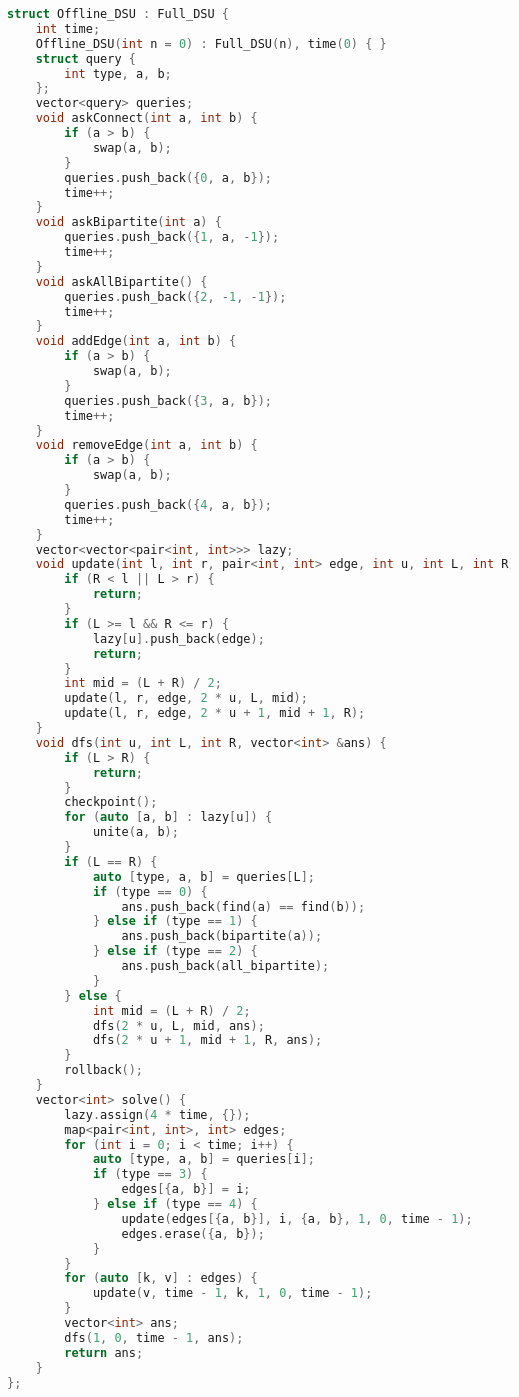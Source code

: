 \documentclass[10pt, a4paper, oneside]{book}
\begin{document}
\begin{lstlisting}[language=C++]
struct Offline_DSU : Full_DSU {
    int time;
    Offline_DSU(int n = 0) : Full_DSU(n), time(0) { }
    struct query {
        int type, a, b;
    };
    vector<query> queries;
    void askConnect(int a, int b) {
        if (a > b) {
            swap(a, b);
        }
        queries.push_back({0, a, b});
        time++;
    }
    void askBipartite(int a) {
        queries.push_back({1, a, -1});
        time++;
    }
    void askAllBipartite() {
        queries.push_back({2, -1, -1});
        time++;
    }
    void addEdge(int a, int b) {
        if (a > b) {
            swap(a, b);
        }
        queries.push_back({3, a, b});
        time++;
    }
    void removeEdge(int a, int b) {
        if (a > b) {
            swap(a, b);
        }
        queries.push_back({4, a, b});
        time++;
    }
    vector<vector<pair<int, int>>> lazy;
    void update(int l, int r, pair<int, int> edge, int u, int L, int R) {
        if (R < l || L > r) {
            return;
        }
        if (L >= l && R <= r) {
            lazy[u].push_back(edge);
            return;
        }
        int mid = (L + R) / 2;
        update(l, r, edge, 2 * u, L, mid);
        update(l, r, edge, 2 * u + 1, mid + 1, R);
    }
    void dfs(int u, int L, int R, vector<int> &ans) {
        if (L > R) {
            return;
        }
        checkpoint();
        for (auto [a, b] : lazy[u]) {
            unite(a, b);
        }
        if (L == R) {
            auto [type, a, b] = queries[L];
            if (type == 0) {
                ans.push_back(find(a) == find(b));
            } else if (type == 1) {
                ans.push_back(bipartite(a));
            } else if (type == 2) {
                ans.push_back(all_bipartite);
            }
        } else {
            int mid = (L + R) / 2;
            dfs(2 * u, L, mid, ans);
            dfs(2 * u + 1, mid + 1, R, ans);
        }
        rollback();
    }
    vector<int> solve() {
        lazy.assign(4 * time, {});
        map<pair<int, int>, int> edges;
        for (int i = 0; i < time; i++) {
            auto [type, a, b] = queries[i];
            if (type == 3) {
                edges[{a, b}] = i;
            } else if (type == 4) {
                update(edges[{a, b}], i, {a, b}, 1, 0, time - 1);
                edges.erase({a, b});
            }
        }
        for (auto [k, v] : edges) {
            update(v, time - 1, k, 1, 0, time - 1);
        }
        vector<int> ans;
        dfs(1, 0, time - 1, ans);
        return ans;
    }
};\end{lstlisting}
\hfill
\end{document}
